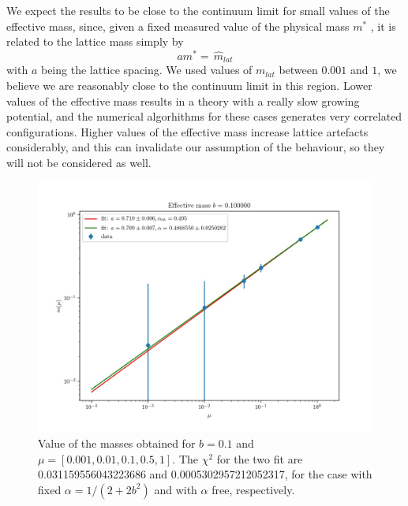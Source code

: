 \documentclass[12pt,a4paper]{report}
\begin{document}
We expect the results to be close to the continuum limit for small values of the effective mass, since, given a fixed measured value of the physical mass $m^*$ , it is related to the lattice mass simply by \begin{equation}
a m^* =  \, \hat m_{lat}
\end{equation} with $a$ being the lattice spacing. We used  values of $m_{lat}$ between $0.001$ and $1$, we believe we are reasonably close to the continuum limit in this region. Lower values of the effective mass results in a theory with a really slow growing potential, and the numerical algorhithms for these cases generates very correlated configurations. Higher values of the effective mass increase lattice artefacts considerably, and this can invalidate our assumption of the behaviour, so they will not be considered as well.
\begin{figure}
\label{fig:mass_scaling_b0.1}
\centering
\includegraphics[width=1.0\textwidth]{b0_1}
\caption{Value of the masses obtained for $b=0.1$ and 
$\mu = [0.001,0.01,0.1,0.5,1]$. The $\chi^2$ for the two fit are 0.031159556043223686 and 0.0005302957212052317, for the case with fixed $\alpha = 1/(2+2b^2)$ and with $\alpha$ free, respectively.}
\end{figure}
\end{document}
